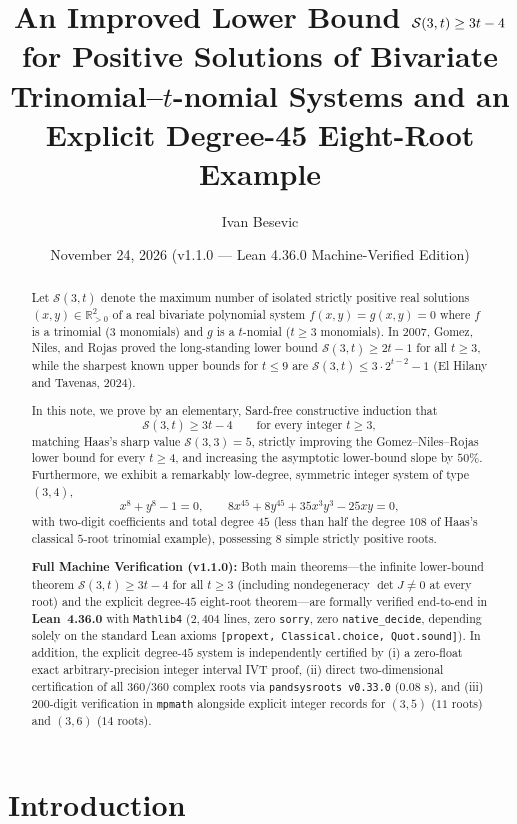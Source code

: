 \documentclass[11pt,a4paper]{amsart}
\title[Improved Lower Bounds $\Sfn(3,t) \ge 3t - 4$ for Fewnomial Systems]{%
An Improved Lower Bound $\Sfn(3, t) \ge 3t - 4$ for Positive Solutions of Bivariate Trinomial--$t$-nomial Systems and an Explicit Degree-45 Eight-Root Example}
\author{Ivan Besevic}
\date{November 24, 2026 (v1.1.0 — Lean 4.36.0 Machine-Verified Edition)}
\theoremstyle{remark}
\newcommand{\R}{\mathbb{R}}
\newcommand{\Sfn}{\mathcal{S}}
\begin{document}
\begin{abstract}
Let $\Sfn(3, t)$ denote the maximum number of isolated strictly positive real solutions $(x, y) \in \R_{>0}^2$ of a real bivariate polynomial system $f(x, y) = g(x, y) = 0$ where $f$ is a trinomial ($3$ monomials) and $g$ is a $t$-nomial ($t \ge 3$ monomials). In 2007, Gomez, Niles, and Rojas proved the long-standing lower bound $\Sfn(3, t) \ge 2t - 1$ for all $t \ge 3$, while the sharpest known upper bounds for $t \le 9$ are $\Sfn(3, t) \le 3 \cdot 2^{t-2} - 1$ (El Hilany and Tavenas, 2024).

In this note, we prove by an elementary, Sard-free constructive induction that
\[
  \Sfn(3, t) \ge 3t - 4 \qquad \text{for every integer } t \ge 3,
\]
matching Haas's sharp value $\Sfn(3, 3) = 5$, strictly improving the Gomez--Niles--Rojas lower bound for every $t \ge 4$, and increasing the asymptotic lower-bound slope by $50\%$. Furthermore, we exhibit a remarkably low-degree, symmetric integer system of type $(3, 4)$,
\[
  x^8 + y^8 - 1 = 0, \qquad 8x^{45} + 8y^{45} + 35x^3 y^3 - 25xy = 0,
\]
with two-digit coefficients and total degree $45$ (less than half the degree $108$ of Haas's classical $5$-root trinomial example), possessing $8$ simple strictly positive roots.

\textbf{Full Machine Verification (v1.1.0):} Both main theorems—the infinite lower-bound theorem $\Sfn(3, t) \ge 3t - 4$ for all $t \ge 3$ (including nondegeneracy $\det J \neq 0$ at every root) and the explicit degree-$45$ eight-root theorem—are formally verified end-to-end in \textbf{Lean~4.36.0} with \texttt{Mathlib4} ($2{,}404$ lines, zero \texttt{sorry}, zero \texttt{native\_decide}, depending solely on the standard Lean axioms \texttt{[propext, Classical.choice, Quot.sound]}). In addition, the explicit degree-$45$ system is independently certified by (i) a zero-float exact arbitrary-precision integer interval IVT proof, (ii) direct two-dimensional certification of all $360/360$ complex roots via \texttt{pandsysroots v0.33.0} ($0.08\text{ s}$), and (iii) $200$-digit verification in \texttt{mpmath} alongside explicit integer records for $(3, 5)$ ($11$ roots) and $(3, 6)$ ($14$ roots).
\end{abstract}

\maketitle

\section{Introduction}
\end{document}
